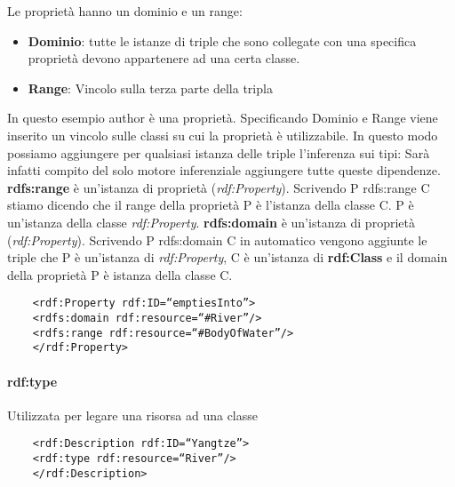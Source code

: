 Le proprietà hanno un dominio e un range:
\begin{itemize}
	\item \textbf{Dominio}: tutte le istanze di triple che sono collegate con una specifica proprietà devono appartenere ad una certa classe.
	\item \textbf{Range}: Vincolo sulla terza parte della tripla 
\end{itemize}
In questo esempio author è una proprietà. Specificando Dominio e Range viene inserito un vincolo sulle classi su cui la proprietà è utilizzabile.
In questo modo possiamo aggiungere per qualsiasi istanza delle triple l'inferenza sui tipi:
Sarà infatti compito del solo motore inferenziale aggiungere tutte queste dipendenze.\newline\newline
\textbf{rdfs:range} è  un'istanza di proprietà (\textit{rdf:Property}). Scrivendo \textcolor{ao(english)}{P rdfs:range C} stiamo dicendo che il range della proprietà P è l'istanza della classe C. P è un'istanza della classe \textit{rdf:Property}.\newline\newline
\textbf{rdfs:domain} è  un'istanza di proprietà (\textit{rdf:Property}). Scrivendo \textcolor{ao(english)}{P rdfs:domain C} in automatico vengono aggiunte  le triple che P è un'istanza di \textit{rdf:Property}, C è un'istanza di \textbf{rdf:Class} e il domain della proprietà P è istanza della classe C.
\begin{verbatim}
	<rdf:Property rdf:ID=“emptiesInto”>
	<rdfs:domain rdf:resource=“#River”/>
	<rdfs:range rdf:resource=“#BodyOfWater”/>
	</rdf:Property>
\end{verbatim}

\paragraph{rdf:type}
Utilizzata per legare una risorsa ad una classe
\begin{verbatim}
	<rdf:Description rdf:ID=“Yangtze”>
	<rdf:type rdf:resource=“River”/>
	</rdf:Description>
\end{verbatim}

